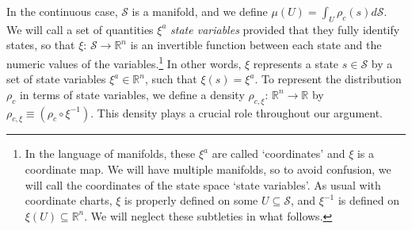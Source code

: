 \documentclass[letterpaper]{article}
\begin{document}
In the continuous case, $\mathcal{S}$ is a manifold, and we define $\mu(U) = \int_U \rho_c(s) d\mathcal{S} $. We will call a set of quantities $\xi^a$ \textit{state variables} provided that they fully identify states, so that $\xi$: $\mathcal{S} \to \mathbb{R}^n$ is an invertible function between each state and the numeric values of the variables.\footnote{In the language of manifolds, these $\xi^a$ are called `coordinates' and $\xi$ is a coordinate map. We will have multiple manifolds, so to avoid confusion, we will call the coordinates of the state space `state variables'. As usual with coordinate charts, $\xi$ is properly defined on some $U \subseteq \mathcal{S}$, and $\xi^{-1}$ is defined on $\xi(U) \subseteq \mathbb{R}^n$. We will neglect these subtleties in what follows.} In other words, $\xi$ represents a state $s \in \mathcal{S}$ by a set of state variables $\xi^a \in \mathbb{R}^n$, such that $\xi (s) = \xi^a$. To represent the distribution $\rho_c$ in terms of state variables, we define a density $\rho_{c, \xi}$: $\mathbb{R}^n \to \mathbb{R}$ by $\rho_{c, \xi} \equiv (\rho_c \circ \xi^{-1})$. This density plays a crucial role throughout our argument. 
\end{document}
